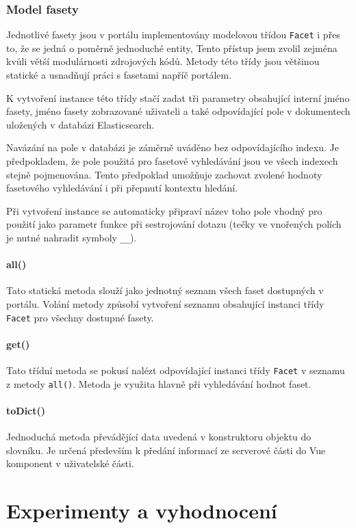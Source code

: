 \subsection{Model fasety}
Jednotlivé fasety jsou v portálu implementovány modelovou třídou \texttt{Facet} i přes to, že se jedná o poměrně jednoduché entity, Tento přístup jsem zvolil zejména kvůli větší modulárnosti zdrojových kódů. Metody této třídy jsou většinou statické a usnadňují práci s fasetami napříč portálem.

K vytvoření instance této třídy stačí zadat tři parametry obsahující interní jméno fasety, jméno fasety zobrazované uživateli a také odpovídající pole v dokumentech uložených v databázi Elasticsearch. 

Navázání na pole v databázi je záměrně uváděno bez odpovídajícího indexu. Je předpokladem, že pole použitá pro fasetové vyhledávání jsou ve všech indexech stejně pojmenována. Tento předpoklad umožňuje zachovat zvolené hodnoty fasetového vyhledávání i při přepnutí kontextu hledání. 

Při vytvoření instance se automaticky připraví název toho pole vhodný pro použití jako parametr funkce při sestrojování dotazu (tečky ve vnořených polích je nutné nahradit symboly \texttt{__}). 

\subsubsection*{all()}
Tato statická metoda slouží jako jednotný seznam všech faset dostupných v portálu. Volání metody způsobí vytvoření seznamu obsahující instanci třídy \texttt{Facet} pro všechny dostupné fasety.

\subsubsection*{get()}
Tato třídní metoda se pokusí nalézt odpovídající instanci třídy \texttt{Facet} v seznamu z metody \texttt{all()}. Metoda je využita hlavně při vyhledávání hodnot faset.

\subsubsection*{toDict()}
Jednoduchá metoda převádějící data uvedená v konstruktoru objektu do slovníku. Je určená především k předání informací ze serverové části do Vue komponent v uživatelské části.



\chapter{Experimenty a vyhodnocení}
\blindtext

